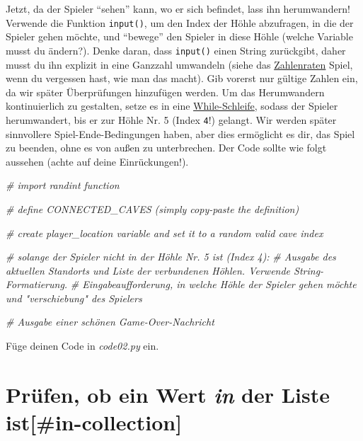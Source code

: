 \documentclass[
]{book}
\newenvironment{Shaded}{\begin{snugshade}}{\end{snugshade}}
\newcommand{\CommentTok}[1]{\textcolor[rgb]{0.56,0.35,0.01}{\textit{#1}}}
\begin{document}
Jetzt, da der Spieler ``sehen'' kann, wo er sich befindet, lass ihn herumwandern! Verwende die Funktion \texttt{input()}, um den Index der Höhle abzufragen, in die der Spieler gehen möchte, und ``bewege'' den Spieler in diese Höhle (welche Variable musst du ändern?). Denke daran, dass \texttt{input()} einen String zurückgibt, daher musst du ihn explizit in eine Ganzzahl umwandeln (siehe das \protect\hyperlink{guess-the-number-single-round}{Zahlenraten} Spiel, wenn du vergessen hast, wie man das macht). Gib vorerst nur gültige Zahlen ein, da wir später Überprüfungen hinzufügen werden. Um das Herumwandern kontinuierlich zu gestalten, setze es in eine \protect\hyperlink{while-loop}{While-Schleife}, sodass der Spieler herumwandert, bis er zur Höhle Nr. 5 (Index \texttt{4}!) gelangt. Wir werden später sinnvollere Spiel-Ende-Bedingungen haben, aber dies ermöglicht es dir, das Spiel zu beenden, ohne es von außen zu unterbrechen. Der Code sollte wie folgt aussehen (achte auf deine Einrückungen!).

\begin{Shaded}
\begin{Highlighting}[]
\CommentTok{\# import randint function}

\CommentTok{\# define CONNECTED\_CAVES (simply copy{-}paste the definition)}

\CommentTok{\# create \textasciigrave{}player\_location\textasciigrave{} variable and set it to a random valid cave index}

\CommentTok{\# solange der Spieler nicht in der Höhle Nr. 5 ist (Index 4):}
    \CommentTok{\# Ausgabe des aktuellen Standorts und Liste der verbundenen Höhlen. Verwende String{-}Formatierung.}
    \CommentTok{\# Eingabeaufforderung, in welche Höhle der Spieler gehen möchte und "verschiebung" des Spielers}
    
\CommentTok{\# Ausgabe einer schönen Game{-}Over{-}Nachricht}
\end{Highlighting}
\end{Shaded}

Füge deinen Code in \emph{code02.py} ein.

\hypertarget{pruxfcfen-ob-ein-wert-in-der-liste-istin-collection}{%
\section{\texorpdfstring{Prüfen, ob ein Wert \emph{in} der Liste ist{[}\#in-collection{]}}{Prüfen, ob ein Wert in der Liste ist{[}\#in-collection{]}}}\label{pruxfcfen-ob-ein-wert-in-der-liste-istin-collection}}
\end{document}
